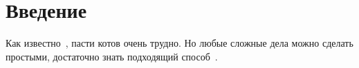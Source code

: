 \section{Введение}

Как известно~\cite[гл.~1]{kak_pasti_kotov}, пасти котов очень трудно. Но любые сложные дела можно сделать простыми, достаточно знать подходящий способ~\cite{pishi, jedi}.

\clearpage
